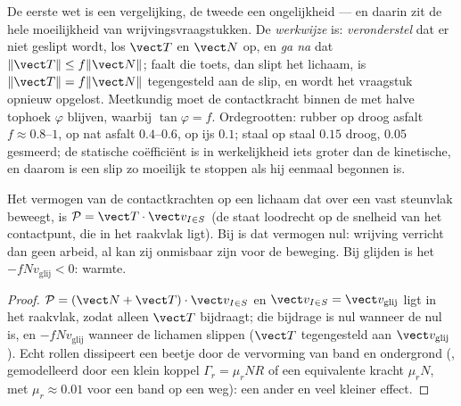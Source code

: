 \begin{remark}\label{rem:b2:rigid-body-mechanics:reading}
De eerste wet is een vergelijking, de tweede een ongelijkheid --- en daarin
zit de hele moeilijkheid van wrijvingsvraagstukken. De \emph{werkwijze} is:
\emph{veronderstel} dat er niet geslipt wordt, los $\vect T$ en $\vect N$
op, en \emph{ga na} dat $\|\vect T\| \le f\|\vect N\|$; faalt die toets,
dan slipt het lichaam, is $\|\vect T\| = f\|\vect N\|$ tegengesteld aan de
slip, en wordt het vraagstuk opnieuw opgelost. Meetkundig moet de
contactkracht binnen de \emph{} met halve tophoek $\varphi$
blijven, waarbij $\tan\varphi
= f$. Ordegrootten: rubber op droog asfalt
$f \approx 0.8$--$1$, op nat asfalt $0.4$--$0.6$, op ijs $0.1$; staal op
staal $0.15$ droog, $0.05$ gesmeerd; de statische coëfficiënt is in
werkelijkheid iets groter dan de kinetische, en daarom is een slip zo
moeilijk te stoppen als hij eenmaal begonnen is.
\end{remark}

\begin{proposition}\label{prop:b2:rigid-body-mechanics:power}
Het vermogen van de contactkrachten op een lichaam dat over een vast
steunvlak beweegt, is $\mathcal P = \vect T\cdot\vect v_{I\in S}$ (de
 staat loodrecht op de snelheid van het contactpunt, die in
het raakvlak ligt). Bij \emph{} is dat vermogen nul:
wrijving verricht dan geen arbeid, al kan zij onmisbaar zijn voor de
beweging. Bij glijden is het $-f N v_{\text{glij}} < 0$: warmte.
\end{proposition}

\begin{proof}
$\mathcal P = (\vect N + \vect T)\cdot\vect v_{I\in S}$ en
$\vect
v_{I\in S} = \vect v_{\text{glij}}$ ligt in het raakvlak, zodat
alleen
$\vect T$ bijdraagt; die bijdrage is nul wanneer de  nul is,
en $-fNv_{\text{glij}}$ wanneer de lichamen slippen ($\vect T$
tegengesteld aan $\vect
v_{\text{glij}}$). Echt rollen dissipeert een
beetje door de vervorming van band en ondergrond (\emph{},
gemodelleerd door een klein koppel $\Gamma_r = \mu_rNR$ of een equivalente
kracht $\mu_rN$, met $\mu_r \approx 0.01$ voor een band op een weg): een
ander en veel kleiner effect.
\end{proof}

